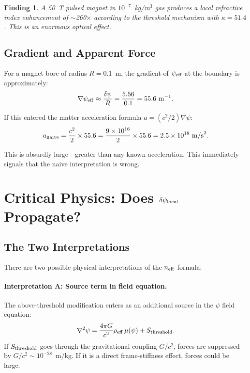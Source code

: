 \documentclass[12pt,a4paper]{article}
\newtheorem{finding}{Finding}
\theoremstyle{remark}
\begin{document}
\begin{finding}
A 50~T pulsed magnet in $10^{-7}$~kg/m$^3$ gas produces a local refractive
index enhancement of $\sim$260$\times$ according to the threshold mechanism
with $\kappa = 51.4$. This is an enormous optical effect.
\end{finding}

\subsection{Gradient and Apparent Force}

For a magnet bore of radius $R = 0.1$~m, the gradient of $\psi_{\rm eff}$
at the boundary is approximately:
\begin{equation}
\nabla\psi_{\rm eff} \approx \frac{\delta\psi}{R} = \frac{5.56}{0.1}
= 55.6~\text{m}^{-1}.
\end{equation}

If this entered the matter acceleration formula $a = (c^2/2)\nabla\psi$:
\begin{equation}
a_{\rm naive} = \frac{c^2}{2} \times 55.6
= \frac{9 \times 10^{16}}{2} \times 55.6 = 2.5 \times 10^{18}~\text{m/s}^2.
\end{equation}

This is absurdly large---greater than any known acceleration. This
immediately signals that the naive interpretation is wrong.

\section{Critical Physics: Does $\delta\psi_{\rm local}$ Propagate?}
\label{sec:propagation}

\subsection{The Two Interpretations}

There are two possible physical interpretations of the $n_{\rm eff}$ formula:

\paragraph{Interpretation A: Source term in field equation.}
The above-threshold modification enters as an additional source in the
$\psi$ field equation:
\begin{equation}
\nabla^2\psi = \frac{4\pi G}{c^2}\rho_{\rm eff}\,\mu(\psi) + S_{\rm threshold}.
\end{equation}
If $S_{\rm threshold}$ goes through the gravitational coupling $G/c^2$,
forces are suppressed by $G/c^2 \sim 10^{-28}$~m/kg. If it is a direct
frame-stiffness effect, forces could be large.
\end{document}
